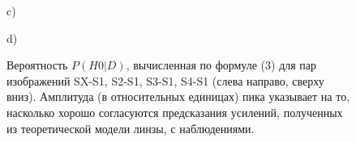 \begin{figure}[H]
\begin{minipage}[h]{0.47\linewidth}
\end{minipage}
\vfill
\begin{minipage}[h]{0.47\linewidth}
 c) \\
\end{minipage}
\hfill
\begin{minipage}[h]{0.47\linewidth}
 d) \\
\end{minipage}
\caption{Вероятность $P( H0 |D)$, вычисленная по формуле (3) для пар изображений SX-S1, S2-S1, S3-S1, S4-S1 (слева направо, сверху вниз). Амплитуда (в относительных единицах) пика указывает на то, насколько хорошо согласуются предсказания усилений, полученных из теоретической модели линзы, с наблюдениями.}
\label{fig:probs}
\end{figure}



